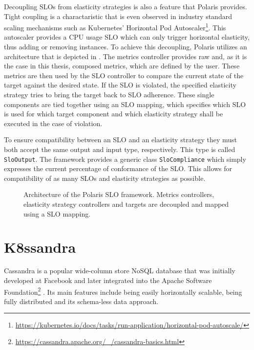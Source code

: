Decoupling SLOs from elasticity strategies is also a feature that Polaris provides. Tight coupling is a charactaristic that is even observed in industry standard scaling mechanisms such as Kubernetes' Horizontal Pod Autoscaler\footnote{\raggedright\url{https://kubernetes.io/docs/tasks/run-application/horizontal-pod-autoscale/}}. This autoscaler provides a CPU usage SLO which can only trigger horizontal elasticity, thus adding or removing instances. To achieve this decoupling, Polaris utilizes an architecture that is depicted in . The metrics controller provides raw and, as it is the case in this thesis, composed metrics, which are defined by the user. These metrics are then used by the SLO controller to compare the current state of the target against the desired state. If the SLO is violated, the specified elasticity strategy tries to bring the target back to SLO adherence. These single components are tied together using an SLO mapping, which specifies which SLO is used for which target component and which elasticity strategy shall be executed in the case of violation. 

To ensure compatibility between an SLO and an elasticity strategy they must both accept the same output and input type, respectively. This type is called \texttt{SloOutput}. The framework provides a generic class \texttt{SloCompliance} which simply expresses the current percentage of conformance of the SLO. This allows for compatibility of as many SLOs and elasticity strategies as possible.

\begin{figure}
    \centering
    \caption{Architecture of the Polaris SLO framework. Metrics controllers, elasticity strategy controllers and targets are decoupled and mapped using a SLO mapping.}
    \label{fig:polaris-architecture}
\end{figure}

\section{K8ssandra}
\label{sec:k8ssandra}

Cassandra is a popular wide-column store NoSQL database that was initially developed at Facebook and later integrated into the Apache Software Foundation\footnote{\url{https://cassandra.apache.org/_/cassandra-basics.html}\label{fn:cassandra-basics}} \cite{lakshmanCassandraDecentralizedStructured2010}. Its main features include being easily horizontally scalable, being fully distributed and its schema-less data approach.

